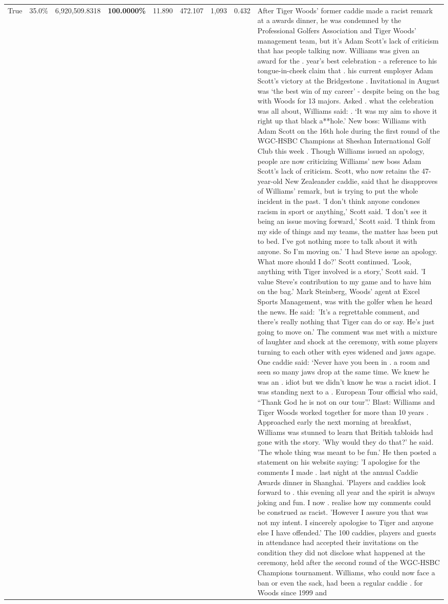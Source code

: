 \begin{table}[H]
\begin{tabular}{lllrlllll}
True & 35.0\% & 6,920,509.8318 & \bfseries \color{red} 100.0000\% & 11.890 & 472.107 & 1,093 & 0.432 & After Tiger Woods' former caddie made a racist remark at a awards dinner, he was condemned by the Professional Golfers Association and Tiger Woods' management team, but it's Adam Scott's lack of criticism that has people talking now. Williams was given an award for the . year’s best celebration - a reference to his tongue-in-cheek claim that . his current employer Adam Scott’s victory at the Bridgestone . Invitational in August was ‘the best win of my career’ - despite being on the bag with Woods for 13 majors. Asked . what the celebration was all about, Williams said: . ‘It was my aim to shove it right up that black a**hole.’ New boss: Williams with Adam Scott  on the 16th hole during the first round of the WGC-HSBC Champions at Sheshan International Golf Club this week . Though Williams issued an apology, people are now criticizing Williams' new boss Adam Scott's lack of criticism. Scott, who now retains the 47-year-old New Zealeander caddie, said that he disapproves of Williams' remark, but is trying to put the whole incident in the past. 'I don't think anyone condones racism in sport or anything,' Scott said. 'I don't see it being an issue moving forward,' Scott said. 'I think from my side of things and my teams, the matter has been put to bed. I've got nothing more to talk about it with anyone. So I'm moving on.' 'I had Steve issue an apology. What more should I do?' Scott continued. 'Look, anything with Tiger involved is a story,' Scott said. 'I value Steve's contribution to my game and to have him on the bag.' Mark Steinberg, Woods' agent at Excel Sports Management, was with the golfer when he heard the news. He said: 'It's a regrettable comment, and there's really nothing that Tiger can do or say. He's just going to move on.' The comment was met with a mixture of laughter and shock at the ceremony, with some players turning to each other with eyes widened and jaws agape. One caddie said: ‘Never have you been in . a room and seen so many jaws drop at the same time. We knew he was an . idiot but we didn’t know he was a racist idiot. I was standing next to a . European Tour official who said, “Thank God he is not on our tour”.’ Blast: Williams and Tiger Woods worked together for more than 10 years . Approached early the next morning at breakfast, Williams was stunned to learn that British tabloids had gone with the story. 'Why would they do that?' he said. 'The whole thing was meant to be fun.' He then posted a statement on his website saying: 'I apologise for the comments I made . last night at the annual Caddie Awards dinner in Shanghai. 'Players and caddies look forward to . this evening all year and the spirit is always joking and fun. I now . realise how my comments could be construed as racist. 'However I assure you that was not my intent. I sincerely apologise to Tiger and anyone else I have offended.' The 100 caddies, players and guests in attendance had accepted their invitations on the condition they did not disclose what happened at the ceremony, held after the second round of the WGC-HSBC Champions tournament. Williams, who could now face a ban or even the sack, had been a regular caddie . for Woods since 1999 and 
\end{tabular}
\end{table}
